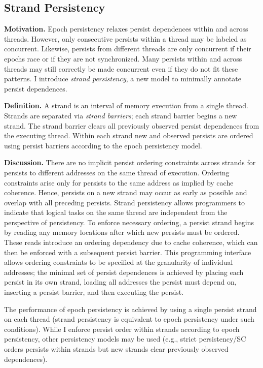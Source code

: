 \subsection{Strand Persistency}
\label{section:PersistencyModels:PersistStrands}

\textbf{Motivation.}
Epoch persistency relaxes persist dependences within and across threads.
However, only consecutive persists within a thread may be labeled as concurrent.
Likewise, persists from different threads are only concurrent if their epochs race or if they are not synchronized.
Many persists within and across threads may still correctly be made concurrent even if they do not fit these patterns.
I introduce \emph{strand persistency}, a new model to minimally annotate persist dependences.

\textbf{Definition.}
A strand is an interval of memory execution from a single thread.
Strands are separated via \emph{strand barriers}; each strand barrier begins a new strand.
The strand barrier clears all previously observed persist dependences from the executing thread.
Within each strand new and observed persists are ordered using persist barriers according to the epoch persistency model.

\textbf{Discussion.}
There are no implicit persist ordering constraints across strands for persists to different addresses on the same thread of execution.
Ordering constraints arise only for persists to the same address as implied by cache coherence.
Hence, persists on a new strand may occur as early as possible and overlap with all preceding persists.
Strand persistency allows programmers to indicate that logical tasks on the same thread are independent from the perspective of persistency.
To enforce necessary ordering, a persist strand begins by reading any memory locations after which new persists must be ordered.
These reads introduce an ordering dependency due to cache coherence, which can then be enforced with a subsequent persist barrier.
This programming interface allows ordering constraints to be specified at the granularity of individual addresses; the minimal set of persist dependences is achieved by placing each persist in its own strand, loading all addresses the persist must depend on, inserting a persist barrier, and then executing the persist.

The performance of epoch persistency is achieved by using a single persist strand on each thread (strand persistency is equivalent to epoch persistency under such conditions).
While I enforce persist order within strands according to epoch persistency, other persistency models may be used (e.g., strict persistency/SC orders persists within strands but new strands clear previously observed dependences).

